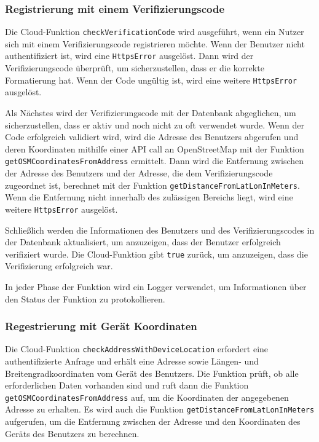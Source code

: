 \subsubsection{Registrierung mit einem Verifizierungscode}\label{subsec:registrierung-verify}

Die Cloud-Funktion \texttt{checkVerificationCode} wird ausgeführt, wenn ein Nutzer sich mit einem Verifizierungscode registrieren möchte. Wenn der Benutzer nicht authentifiziert ist, wird eine \texttt{HttpsError} ausgelöst. Dann wird der Verifizierungscode überprüft, um sicherzustellen, dass er die korrekte Formatierung hat. Wenn der Code ungültig ist, wird eine weitere \texttt{HttpsError} ausgelöst.

Als Nächstes wird der Verifizierungscode mit der Datenbank abgeglichen, um sicherzustellen, dass er aktiv und noch nicht zu oft verwendet wurde. Wenn der Code erfolgreich validiert wird, wird die Adresse des Benutzers abgerufen und deren Koordinaten mithilfe einer API call an OpenStreetMap mit der Funktion \texttt{getOSMCoordinatesFromAddress} ermittelt. Dann wird die Entfernung zwischen der Adresse des Benutzers und der Adresse, die dem Verifizierungscode zugeordnet ist, berechnet mit der Funktion \texttt{getDistanceFromLatLonInMeters}. Wenn die Entfernung nicht innerhalb des zulässigen Bereichs liegt, wird eine weitere \texttt{HttpsError} ausgelöst.

Schließlich werden die Informationen des Benutzers und des Verifizierungscodes in der Datenbank aktualisiert, um anzuzeigen, dass der Benutzer erfolgreich verifiziert wurde. Die Cloud-Funktion gibt \texttt{true} zurück, um anzuzeigen, dass die Verifizierung erfolgreich war.

In jeder Phase der Funktion wird ein Logger verwendet, um Informationen über den Status der Funktion zu protokollieren.

\subsubsection{Regestrierung mit Gerät Koordinaten}

Die Cloud-Funktion \texttt{checkAddressWithDeviceLocation} erfordert eine authentifizierte Anfrage und erhält eine Adresse sowie Längen- und Breitengradkoordinaten vom Gerät des Benutzers. Die Funktion prüft, ob alle erforderlichen Daten vorhanden sind und ruft dann die Funktion \texttt{getOSMCoordinatesFromAddress} auf, um die Koordinaten der angegebenen Adresse zu erhalten. Es wird auch die Funktion \texttt{getDistanceFromLatLonInMeters} aufgerufen, um die Entfernung zwischen der Adresse und den Koordinaten des Geräts des Benutzers zu berechnen.

